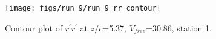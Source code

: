\begin{figure}[H]
\centering
\texttt{[image: figs/run\_9/run\_9\_rr\_contour]}
\caption{Contour plot of $\overline{r^\prime r^\prime}$ at $z/c$=5.37, $V_{free}$=30.86, station 1.}
\label{fig:run_9_rr_contour}
\end{figure}


